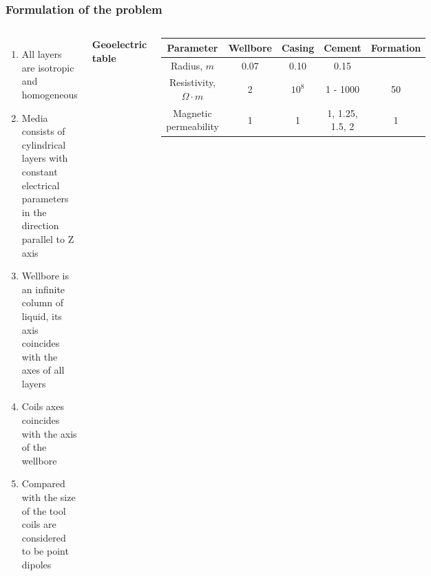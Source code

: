 \documentclass[aspectratio=169]{beamer}
\begin{document}
%
%
\begin{frame}
\frametitle{Formulation of the problem}

\begin{columns}[c] 

\footnotesize
\begin{enumerate} 
\item All layers are isotropic and homogeneous
\item Media consists of cylindrical layers with constant electrical parameters in the direction parallel to Z axis
\item Wellbore is an infinite column of liquid, its axis coincides with the axes of all layers
\item Coils axes coincides with the axis of the wellbore
\item Compared with the size of the tool coils are considered to be point dipoles
\end{enumerate} 

\hspace*{1 cm} \textbf{Geoelectric table}
\begin{tiny}
\begin{table}
\begin{tabular}{c|c|c|c|c}

{Parameter} & {Wellbore} & {Casing}& {Cement} & {Formation} \\
\midrule
Radius, $m$             & 0.07 & 0.10 & 0.15 &  \\
Resistivity, $\Omega\cdot m$    & 2 & $10^8$ & 1 - 1000 & 50 \\
Magnetic permeability & 1 & 1 & 1, 1.25, 1.5, 2 & 1  \\

\end{tabular}
\end{table}
\end{tiny}

\begin{center}
	\includegraphics[scale=0.5]{Borehole_big_2.eps}


\end{center}
\end{columns}

\end{frame}
\end{document}
